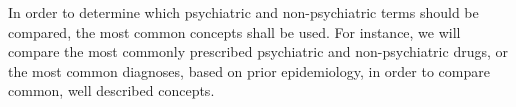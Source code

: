 \documentclass[10pt]{article}
\begin{document}

In order to determine which psychiatric and non-psychiatric terms should be compared, the most common concepts shall be used. For instance, we will compare the most commonly prescribed psychiatric and non-psychiatric drugs, or the most common diagnoses, based on prior epidemiology, in order to compare common, well described concepts.
\end{document}

